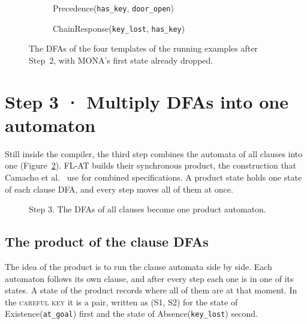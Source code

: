 \documentclass[11pt,english,listoffigures,listoftables]{tfgetsinf}
\newcommand{\runex}[1]{\textsc{#1}}  %
\begin{document}
\begin{figure}[H]
\begin{subfigure}[b]{0.49\textwidth}
    \caption{Precedence(\texttt{has\_key}, \texttt{door\_open})}
\end{subfigure}\hfill
\begin{subfigure}[b]{0.49\textwidth}
    \centering
    \caption{ChainResponse(\texttt{key\_lost}, \texttt{has\_key})}
\end{subfigure}
\caption[DFAs of the running examples]{The DFAs of the four templates of the running examples after Step~2, with MONA's first state already dropped.}
\label{fig:run-dfas}
\end{figure}

\section{Step 3 · Multiply DFAs into one automaton}
\label{sec:step3}
Still inside the compiler, the third step combines the automata of all clauses into one (Figure~\ref{fig:step3}). FL-AT builds their synchronous product, the construction that Camacho et al.~\cite{camacho2019ltl} use for combined specifications. A product state holds one state of each clause DFA, and every step moves all of them at once. 

\begin{figure}[H]
\centering
{}
\caption[Step 3 of FARM]{Step 3. The DFAs of all clauses become one product automaton.}
\label{fig:step3}
\end{figure}

\subsection{The product of the clause DFAs}
The idea of the product is to run the clause automata side by side. Each automaton follows its own clause, and after every step each one is in one of its states. A state of the product records where all of them are at that moment. In the \runex{careful key} it is a pair, written as (S1, S2) for the state of Existence(\texttt{at\_goal}) first and the state of Absence(\texttt{key\_lost}) second.
\end{document}
